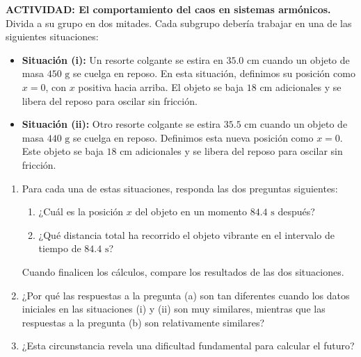 \item \textbf{ACTIVIDAD: El comportamiento del caos en sistemas armónicos.}
Divida a su grupo en dos mitades. Cada subgrupo debería trabajar en una de las siguientes situaciones:
\begin{itemize}
    \item \textbf{Situación (i):} Un resorte colgante se estira en $35.0\text{ cm}$ cuando un objeto de masa $450\text{ g}$ se cuelga en reposo. En esta situación, definimos su posición como $x = 0$, con $x$ positiva hacia arriba. El objeto se baja $18\text{ cm}$ adicionales y se libera del reposo para oscilar sin fricción.
    \item \textbf{Situación (ii):} Otro resorte colgante se estira $35.5\text{ cm}$ cuando un objeto de masa $440\text{ g}$ se cuelga en reposo. Definimos esta nueva posición como $x = 0$. Este objeto se baja $18\text{ cm}$ adicionales y se libera del reposo para oscilar sin fricción.
\end{itemize}
\begin{enumerate}
    \item Para cada una de estas situaciones, responda las dos preguntas siguientes:
    \begin{enumerate}
        \item ¿Cuál es la posición $x$ del objeto en un momento $84.4\text{ s}$ después?
        \item ¿Qué distancia total ha recorrido el objeto vibrante en el intervalo de tiempo de $84.4\text{ s}$?
    \end{enumerate}
    Cuando finalicen los cálculos, compare los resultados de las dos situaciones.
    \item ¿Por qué las respuestas a la pregunta (a) son tan diferentes cuando los datos iniciales en las situaciones (i) y (ii) son muy similares, mientras que las respuestas a la pregunta (b) son relativamente similares?
    \item ¿Esta circunstancia revela una dificultad fundamental para calcular el futuro?
\end{enumerate}
